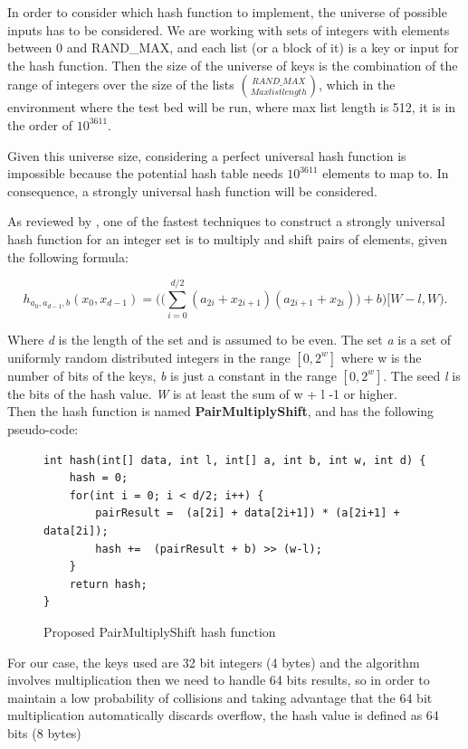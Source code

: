 \documentclass[a4paper,12pt]{article}
\begin{document}
In order to consider which hash function to implement, the universe of possible inputs has to be considered. We are working with sets of integers with elements between 0 and RAND\_MAX, and each list (or a block of it) is a key or input for the hash function. 
Then the size of the universe of keys is the combination of the range of integers over the size of the lists $\binom{RAND\_MAX}{Max list length} $, which in the environment where the test bed will be run, where max list length is 512, it is in the order of $10^{3611}$.

Given this universe size, considering a perfect universal hash function is impossible because the potential hash table needs $10^{3611}$ elements to map to. In consequence, a strongly universal hash function will be considered.

As reviewed by \cite{thorup2015high}, one of the fastest techniques to construct a strongly universal hash function for an integer set is to multiply and shift pairs of elements, given the following formula:

\begin{equation}
	h_{a_0,a_{d-1},b} (x_0, x_{d-1}) = \Bigg(\Bigg( \sum_{i=0}^{d/2} (a_{2i} + x_{2i+1})  (a_{2i+1} + x_{2i})\Bigg)  + b\Bigg) [W-l, W).
\end{equation}

Where {\it d}  is the length of the set and is assumed to be even. The set {\it a} is a set of uniformly random distributed integers in the  range $[0,2^w]$ where w is the number of bits of the keys, {\it b}  is just a constant in the range $[0,2^w]$. The seed {\it l}  is the bits of the hash value. {\it W}  is at least the sum of w + l -1 or higher. \\
Then the hash function is named {\bf PairMultiplyShift}, and has the following pseudo-code:

\begin{figure}[H]
\begin{verbatim}
int hash(int[] data, int l, int[] a, int b, int w, int d) {
    hash = 0;
    for(int i = 0; i < d/2; i++) {
        pairResult =  (a[2i] + data[2i+1]) * (a[2i+1] + data[2i]);
        hash +=  (pairResult + b) >> (w-l);
    }
    return hash;
}
\end{verbatim}
\caption{Proposed PairMultiplyShift hash function}
\end{figure}

For our case, the keys used are 32 bit integers (4 bytes) and the algorithm involves multiplication then we need to handle 64 bits results, so in order to maintain a low probability of collisions and taking advantage that the 64 bit multiplication automatically discards overflow,  the hash value is defined as 64 bits (8 bytes)
\\
\end{document}
